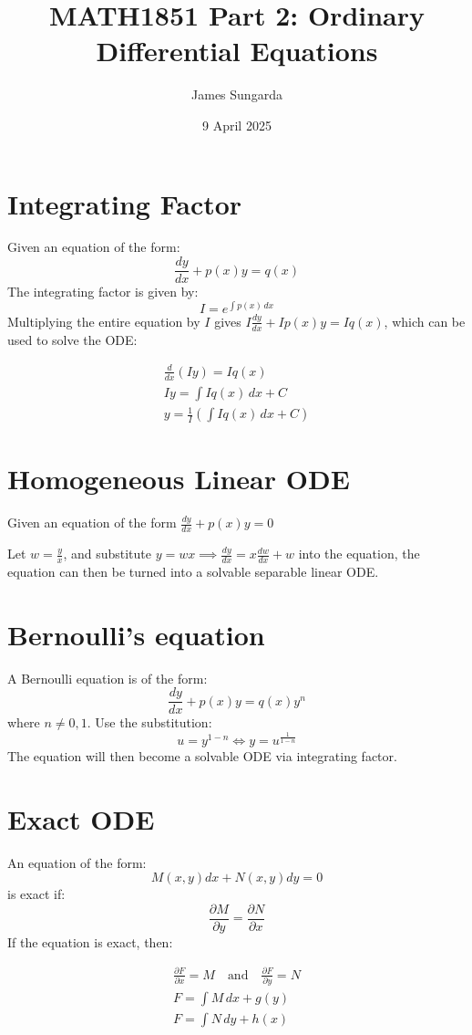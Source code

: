 \documentclass{scrartcl}
\title{MATH1851 Part 2: Ordinary Differential Equations}
\author{James Sungarda}
\date{9 April 2025}
\begin{document}
\maketitle

\section{Integrating Factor}
Given an equation of the form:
\[
\frac{dy}{dx} + p(x)y = q(x)
\] 
The integrating factor is given by:
\[
I = e^{\int p(x) \, dx}
\]
Multiplying the entire equation by \(I\) gives \(I\frac{dy}{dx} + Ip(x)y = Iq(x)\), which can be used to solve the ODE:

\begin{gather}
    \frac{d}{dx}(Iy) = Iq(x) \\
    Iy = \int Iq(x) \, dx + C  \\
    y = \frac{1}{I}\left(\int Iq(x) \, dx + C\right)
\end{gather}

\section{Homogeneous Linear ODE}
Given an equation of the form \(\frac{dy}{dx} + p(x)y = 0\)

Let \(w = \frac{y}{x}\), and substitute \(y = wx \implies \frac{dy}{dx} = x\frac{dw}{dx} + w\) into the equation, the equation can then be turned into a solvable separable linear ODE.

\section{Bernoulli's equation}
A Bernoulli equation is of the form:
\[
\frac{dy}{dx} + p(x)y = q(x)y^n
\]
where \(n \neq 0, 1\).
Use the substitution:
\[
u = y^{1-n} \iff y = u^{\frac{1}{1-n}}
\]
The equation will then become a solvable ODE via integrating factor.

\section{Exact ODE}
An equation of the form:
\[
M(x,y)dx + N(x,y)dy = 0
\]
is exact if:
\[
\frac{\partial M}{\partial y} = \frac{\partial N}{\partial x}
\]
If the equation is exact, then:

\begin{gather}
\frac{\partial F}{\partial x} = M \quad \text{and} \quad \frac{\partial F}{\partial y} = N \\
F = \int M \, dx + g(y) \\
F = \int N \, dy + h(x)
\end{gather}
\end{document}
